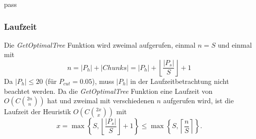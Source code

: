 pass\documentclass[a4paper,10pt,ngerman]{scrartcl}
\begin{document}
    \subsubsection{Laufzeit}
    Die \textit{GetOptimalTree} Funktion wird zweimal aufgerufen, einmal $n = S$ und einmal mit
    \[n = |P_h| + |Chunks| = |P_h| +  \left\lfloor   \frac {|P_s|} {S}  \right\rfloor + 1\]
    Da $|P_h| \le 20$ (für $P_{cut} = 0.05$), muss $|P_h|$ in der Laufzeitbetrachtung nicht beachtet werden.
    Da die \textit{GetOptimalTree} Funktion eine Laufzeit von $O\left(C{{2n} \choose n}  \right)$ hat und zweimal mit verschiedenen $n$ aufgerufen wird, ist die Laufzeit der Heuristik $O\left(C{{2x} \choose x}  \right)$ mit
    \[x = \max \left\{ S, \left\lfloor   \frac {|P_s|} {S}  \right\rfloor + 1 \right\} \le \max \left\{S, \left\lceil \frac n S \right\rceil \right\}.\]
\end{document}
